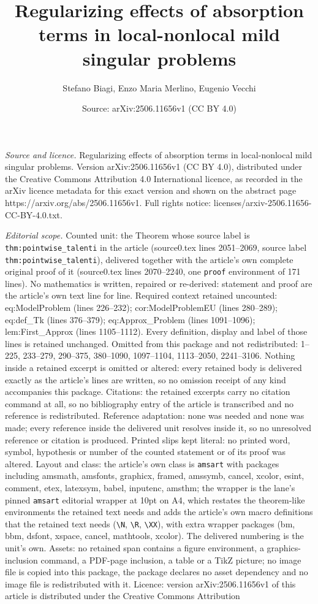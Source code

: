\documentclass[10pt,a4paper]{amsart}
\title[Regularizing effects of absorption terms in local-nonlocal m]{Regularizing effects of absorption terms in local-nonlocal mild singular problems}
\author{Stefano Biagi, Enzo Maria Merlino, Eugenio Vecchi}
\date{Source: arXiv:2506.11656v1 (CC BY 4.0)}
\begin{document}
\maketitle

\noindent\emph{Source and licence.} Regularizing effects of absorption terms in local-nonlocal mild singular problems. Version arXiv:2506.11656v1 (CC BY 4.0), distributed under the Creative Commons Attribution 4.0 International licence, as recorded in the arXiv licence metadata for this exact version and shown on the abstract page https://arxiv.org/abs/2506.11656v1. Full rights notice: licenses/arxiv-2506.11656-CC-BY-4.0.txt.\par\smallskip

\noindent\textit{Editorial scope.} Counted unit: the Theorem whose source label is \texttt{thm:pointwise\_talenti} in the article (source0.tex lines 2051--2069, source label \texttt{thm:pointwise\_talenti}), delivered together with the article's own complete original proof of it (source0.tex lines 2070--2240, one \texttt{proof} environment of 171 lines). No mathematics is written, repaired or re-derived: statement and proof are the article's own text line for line. Required context retained uncounted: eq:ModelProblem (lines 226--232); cor:ModelProblemEU (lines 280--289); eq:def\_Tk (lines 376--379); eq:Approx\_Problem (lines 1091--1096); lem:First\_Approx (lines 1105--1112). Every definition, display and label of those lines is retained unchanged. Omitted from this package and not redistributed: 1--225, 233--279, 290--375, 380--1090, 1097--1104, 1113--2050, 2241--3106. Nothing inside a retained excerpt is omitted or altered: every retained body is delivered exactly as the article's lines are written, so no omission receipt of any kind accompanies this package. Citations: the retained excerpts carry no citation command at all, so no bibliography entry of the article is transcribed and no reference is redistributed. Reference adaptation: none was needed and none was made; every reference inside the delivered unit resolves inside it, so no unresolved reference or citation is produced. Printed slips kept literal: no printed word, symbol, hypothesis or number of the counted statement or of its proof was altered. Layout and class: the article's own class is \texttt{amsart} with packages including amsmath, amsfonts, graphicx, framed, amssymb, cancel, xcolor, esint, comment, etex, latexsym, babel, inputenc, amsthm; the wrapper is the lane's pinned \texttt{amsart} editorial wrapper at 10pt on A4, which restates the theorem-like environments the retained text needs and adds the article's own macro definitions that the retained text needs (\texttt{\textbackslash N}, \texttt{\textbackslash R}, \texttt{\textbackslash XX}), with extra wrapper packages (bm, bbm, dsfont, xspace, cancel, mathtools, xcolor). The delivered numbering is the unit's own. Assets: no retained span contains a figure environment, a graphics-inclusion command, a PDF-page inclusion, a table or a TikZ picture; no image file is copied into this package, the package declares no asset dependency and no image file is redistributed with it. Licence: version arXiv:2506.11656v1 of this article is distributed under the Creative Commons Attribution 
\end{document}
